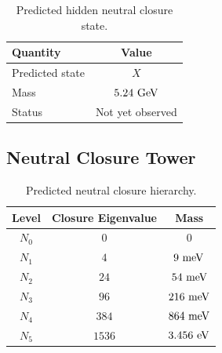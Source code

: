 \documentclass[11pt]{article}
\theoremstyle{definition}
\theoremstyle{remark}
\begin{document}
\begin{table}[H]
\centering
\caption{Predicted hidden neutral closure state.}
\begin{tabular}{lc}
\toprule
Quantity & Value \\
\midrule
Predicted state & $X$ \\
Mass & $5.24~{\rm GeV}$ \\
Status & Not yet observed \\
\bottomrule
\end{tabular}
\end{table}


\subsection{Neutral Closure Tower}

\begin{table}[H]
\centering
\caption{Predicted neutral closure hierarchy.}
\begin{tabular}{ccc}
\toprule
Level & Closure Eigenvalue & Mass \\
\midrule
$N_0$ & $0$ & $0$ \\
$N_1$ & $4$ & $9~{\rm meV}$ \\
$N_2$ & $24$ & $54~{\rm meV}$ \\
$N_3$ & $96$ & $216~{\rm meV}$ \\
$N_4$ & $384$ & $864~{\rm meV}$ \\
$N_5$ & $1536$ & $3.456~{\rm eV}$ \\
\bottomrule
\end{tabular}
\end{table}




\end{document}
